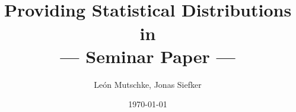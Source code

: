 \documentclass{report}
\title{\epsfig{file=Figures/dhbw-logo.pdf, scale=1.5}\\[0.3cm] 
      Providing Statistical Distributions in \setlx \\[0.3cm]
      --- Seminar Paper ---}
\author{Le\'{o}n Mutschke, Jonas Siefker}
\date{\today \\[2.5cm]
	\noindent
}
\begin{document}
\maketitle


\tableofcontents




\lstlistoflistings






\end{document}
